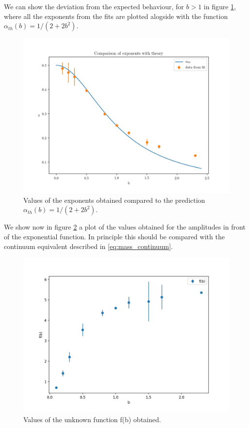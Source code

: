 \documentclass[12pt,a4paper]{report}
\begin{document}
We can show the deviation from the expected behaviour, for $b>1$ in figure \ref{fig:alphavsb}, where all the exponents from the fits are plotted alogside with the function $\alpha_{th}(b)=1/(2+2b^2)$.


\begin{figure}
\centering
\includegraphics[width=1.0\textwidth]{alphavsb}
\caption{Values of the exponents obtained compared to the prediction $\alpha_{th}(b)=1/(2+2b^2)$.}
\label{fig:alphavsb}
\end{figure} 

 We show now in figure \ref{fig:f_b} a plot of the values obtained for the amplitudes in front of the exponential function. In principle this should be compared with the continuum equivalent described in \eqref{eq:mass_continuum}.
\begin{figure}
\centering
\includegraphics[width=1.0\textwidth]{f_b_corr}
\caption{Values of the unknown function f(b) obtained.}
\label{fig:f_b}
\end{figure} 
\end{document}
